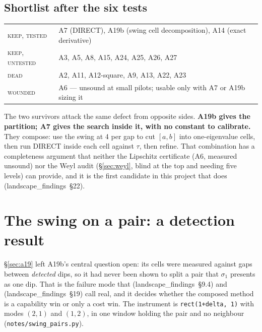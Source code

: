 \documentclass[11pt]{article}
\newcommand{\file}[1]{\texttt{#1}}
\newcommand{\lf}[1]{(landscape\_findings~\S#1)}
\newcommand{\sig}{\sigma}
\newcommand{\sione}{\sig_1}
\begin{document}
\subsection{Shortlist after the six tests}

\begin{center}
\begin{tabular}{ll}
\toprule
\textsc{keep, tested}   & A7 (DIRECT), A19b (swing cell decomposition), A14 (exact derivative) \\
\textsc{keep, untested} & A3, A5, A8, A15, A24, A25, A26, A27 \\
\textsc{dead}           & A2, A11, A12-square, A9, A13, A22, A23 \\
\textsc{wounded}        & A6 --- unsound at small pilots; usable only with A7 or A19b sizing it \\
\bottomrule
\end{tabular}
\end{center}

The two survivors attack the same defect from opposite sides. \textbf{A19b gives the partition;
A7 gives the search inside it, with no constant to calibrate.} They compose: use the swing at 4
per gap to cut $[a,b]$ into one-eigenvalue cells, then run DIRECT inside each cell against $\tau$,
then refine. That combination has a completeness argument that neither the Lipschitz certificate
(A6, measured unsound) nor the Weyl audit (\S\ref{sec:weyl}, blind at the top and needing five
levels) can provide, and it is the first candidate in this project that does \lf{22}.

\section{The swing on a pair: a detection result}
\label{sec:swingpairs}

\S\ref{sec:a19} left A19b's central question open: its cells were measured against gaps between
\emph{detected} dips, so it had never been shown to split a pair that $\sione$ presents as one
dip. That is the failure mode that \lf{9.4} and \lf{19} call real, and it decides whether the
composed method is a capability win or only a cost win. The instrument is
\verb|rect(1+delta, 1)| with modes $(2,1)$ and $(1,2)$, in one window holding the pair and no
neighbour (\file{notes/swing\_pairs.py}).
\end{document}
